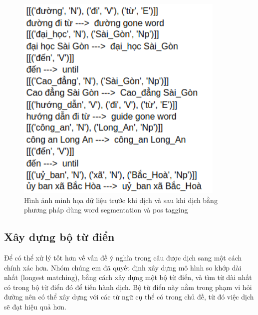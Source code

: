 \begin{figure}[htp]
    \centering
    \includegraphics[width=10cm]{images/trainingdata-wordsegment.png}
    \caption{Hình ảnh minh họa dữ liệu trước khi dịch và sau khi dịch bằng phương pháp dùng word segmentation và pos tagging}
    \label{fig:trainingdata-wordsegment}
\end{figure}



\subsection{Xây dựng bộ từ điển}
Để có thể xử lý tốt hơn về vấn đề ý nghĩa trong câu được dịch sang một cách chính xác hơn. Nhóm chúng em đã quyết định xây dựng mô hình so khớp dài nhất (longest matching), bằng cách xây dựng một bộ từ điển, và tìm từ dài nhất có trong bộ từ điển đó để tiến hành dịch. Bộ từ điển này nằm trong phạm vi hỏi đường nên có thể xây dựng với các từ ngữ cụ thể có trong chủ đề, từ đó việc dịch sẽ đạt hiệu quả hơn.

